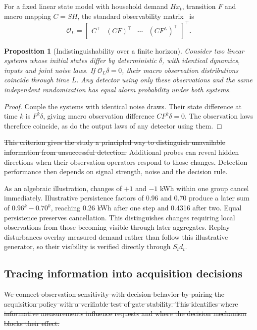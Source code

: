 \documentclass[conference]{IEEEtran}
\newtheorem{proposition}{Proposition}
\providecommand{\DIFdeltex}[1]{{\protect\color{red}\sout{#1}}}                      %
\providecommand{\DIFdelbegin}{} %
\providecommand{\DIFdelend}{} %
\providecommand{\DIFdel}[1]{\texorpdfstring{\DIFdeltex{#1}}{}} %
\begin{document}
For a fixed linear state model with household demand $Hx_t$, transition $F$ and macro mapping $C=SH$, the standard observability matrix~\cite{hespanha} is
\begin{equation}
\mathcal O_L=\begin{bmatrix}C^\top&(CF)^\top&\cdots&(CF^L)^\top\end{bmatrix}^{\!\top}.
\end{equation}
\begin{proposition}[Indistinguishability over a finite horizon]
Consider two linear systems whose initial states differ by deterministic $\delta$, with identical dynamics, inputs and joint noise laws. If $\mathcal O_L\delta=0$, their macro observation distributions coincide through time $L$. Any detector using only these observations and the same independent randomization has equal alarm probability under both systems.
\end{proposition}
\begin{proof}
Couple the systems with identical noise draws. Their state difference at time $k$ is $F^k\delta$, giving macro observation difference $CF^k\delta=0$. The observation laws therefore coincide, as do the output laws of any detector using them.
\end{proof}

\DIFdelbegin \DIFdel{This criterion gives the study a principled way to distinguish unavailable information from unsuccessful detection. }\DIFdelend Additional probes can reveal hidden directions when their observation operators respond to those changes. Detection performance then depends on signal strength, noise and the decision rule.

As an algebraic illustration, changes of $+1$ and $-1$ kWh within one group cancel immediately. Illustrative persistence factors of 0.96 and 0.70 produce a later sum of $0.96^k-0.70^k$, reaching 0.26 kWh after one step and 0.4316 after two. Equal persistence preserves cancellation. This distinguishes changes requiring local observations from those becoming visible through later aggregates. Replay disturbances overlay measured demand rather than follow this illustrative generator, so their visibility is verified directly through $S_t d_t$.







\subsection{Tracing information into acquisition decisions}
\DIFdelbegin \DIFdel{We connect observation sensitivity with decision behavior by pairing the acquisition policy with a verifiable test of gate stability. This identifies where informative measurements influence requests and where the decision mechanism blocks their effect.
}%
\end{document}
